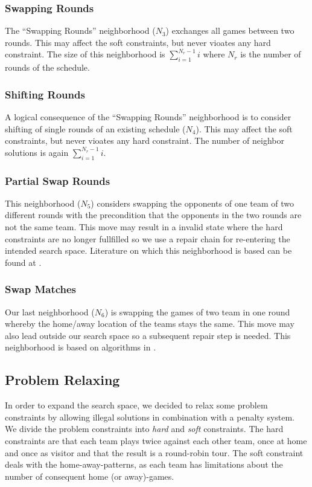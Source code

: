 \documentclass[a4paper,11pt]{article}
\begin{document}
\subsubsection{Swapping Rounds}
The ``Swapping Rounds'' neighborhood ($N_3$) exchanges all games between two rounds.
This may affect the soft constraints, but never vioates any hard constraint.
The size of this neighborhood is $\sum_{i=1}^{N_r-1}i$ where $N_r$ is the number of rounds of the schedule.

\subsubsection{Shifting Rounds}
A logical consequence of the ``Swapping Rounds'' neighborhood is to consider shifting of single rounds of an existing schedule ($N_4$).
This may affect the soft constraints, but never vioates any hard constraint.
The number of neighbor solutions is again $\sum_{i=1}^{N_r-1}i$.

\subsubsection{Partial Swap Rounds}
This neighborhood ($N_5$) considers swapping the opponents of one team of two different rounds with the precondition that the opponents in the
two rounds are not the same team. This move may result in a invalid state where the hard constraints are no longer fullfilled so we use a
repair chain for re-entering the intended search space. Literature on which this neighborhood is based can be found at \cite{Gaspero07,HentenryckV06, Chen_anant}.

\subsubsection{Swap Matches}
Our last neighborhood ($N_6$) is swapping the games of two team  in one round whereby the home/away location of the teams stays the same.
This move may also lead outside our search space so a subsequent repair step is needed. This neighborhood is based on algorithms in \cite{Gaspero07, HentenryckV06}.

\subsection{Problem Relaxing}
In order to expand the search space, we decided to relax some problem constraints by allowing illegal solutions in combination with a penalty system.
We divide the problem constraints into \emph{hard} and \emph{soft} constraints. The hard constraints are that each team plays twice against
each other team, once at home and once as visitor and that the result is a round-robin tour.
The soft constraint deals with the home-away-patterns, as each team has limitations about the number of consequent home (or away)-games.
\end{document}
